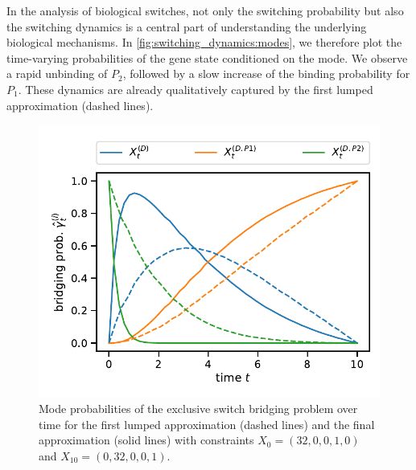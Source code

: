 In the analysis of biological switches, not only the switching probability    
but also the switching dynamics is a central part of understanding the underlying biological mechanisms.
In \autoref{fig:switching_dynamics:modes}, we therefore plot the time-varying probabilities of the gene state conditioned on the mode.
We observe a rapid unbinding of $P_2$, followed by a slow increase of the binding probability for $P_1$.
These dynamics are already qualitatively captured by the first lumped approximation (dashed lines).
\begin{figure}
    \centering
    \includegraphics[scale=.6]{gfx/excl_switch_modeprobs.pdf}
	\caption[Mode probabilities of the exclusive switch bridging problem]{Mode probabilities of the exclusive switch bridging problem over time for the first lumped approximation (dashed lines) and the final approximation (solid lines) with constraints $X_0=(32, 0, 0, 1, 0)$ and $X_{10}=(0,32,0,0,1)$. \label{fig:switching_dynamics:modes}}
\end{figure}

